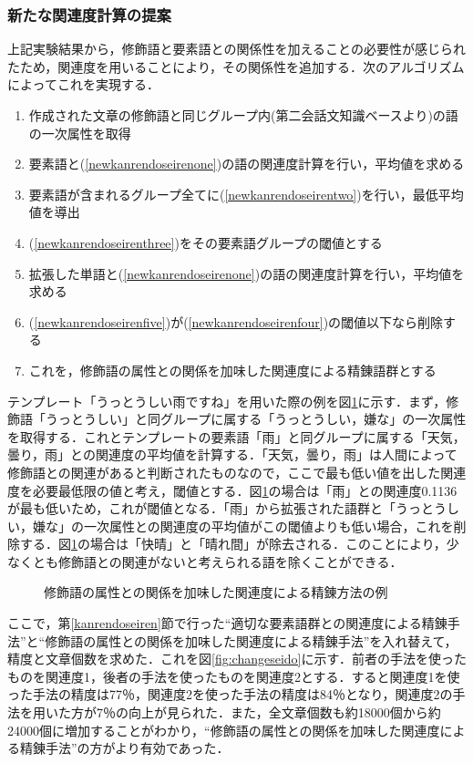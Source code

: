 \subsubsection{新たな関連度計算の提案}
上記実験結果から，修飾語と要素語との関係性を加えることの必要性が感じられたため，関連度を用いることにより，その関係性を追加する．次のアルゴリズムによってこれを実現する．
\begin{enumerate}
	\item \label{newkanrendoseirenone}作成された文章の修飾語と同じグループ内(第二会話文知識ベースより)の語の一次属性を取得
	\item \label{newkanrendoseirentwo}要素語と(\ref{newkanrendoseirenone})の語の関連度計算を行い，平均値を求める
	\item \label{newkanrendoseirenthree}要素語が含まれるグループ全てに(\ref{newkanrendoseirentwo})を行い，最低平均値を導出
	\item \label{newkanrendoseirenfour}(\ref{newkanrendoseirenthree})をその要素語グループの閾値とする
	\item \label{newkanrendoseirenfive}拡張した単語と(\ref{newkanrendoseirenone})の語の関連度計算を行い，平均値を求める
	\item (\ref{newkanrendoseirenfive})が(\ref{newkanrendoseirenfour})の閾値以下なら削除する
	\item これを，修飾語の属性との関係を加味した関連度による精錬語群とする
\end{enumerate}

テンプレート「うっとうしい雨ですね」を用いた際の例を図\ref{fig:newRelExam}に示す．まず，修飾語「うっとうしい」と同グループに属する「うっとうしい，嫌な」の一次属性を取得する．これとテンプレートの要素語「雨」と同グループに属する「天気，曇り，雨」との関連度の平均値を計算する．「天気，曇り，雨」は人間によって修飾語との関連があると判断されたものなので，ここで最も低い値を出した関連度を必要最低限の値と考え，閾値とする．図\ref{fig:newRelExam}の場合は「雨」との関連度0.1136が最も低いため，これが閾値となる．「雨」から拡張された語群と「うっとうしい，嫌な」の一次属性との関連度の平均値がこの閾値よりも低い場合，これを削除する．図\ref{fig:newRelExam}の場合は「快晴」と「晴れ間」が除去される．このことにより，少なくとも修飾語との関連がないと考えられる語を除くことができる．
\begin{figure}[htbp]
	\begin{center}
	  	\epsfxsize=10cm
		\caption{修飾語の属性との関係を加味した関連度による精錬方法の例}
		\label{fig:newRelExam}
	\end{center}
\end{figure}
ここで，第\ref{kanrendoseiren}節で行った“適切な要素語群との関連度による精錬手法”と“修飾語の属性との関係を加味した関連度による精錬手法”を入れ替えて，精度と文章個数を求めた．これを図\ref{fig:changeseido}に示す．前者の手法を使ったものを関連度1，後者の手法を使ったものを関連度2とする．すると関連度1を使った手法の精度は77％，関連度2を使った手法の精度は84％となり，関連度2の手法を用いた方が7％の向上が見られた．また，全文章個数も約18000個から約24000個に増加することがわかり，“修飾語の属性との関係を加味した関連度による精錬手法”の方がより有効であった．

